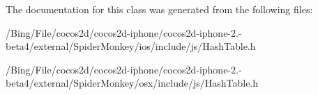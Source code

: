 The documentation for this class was generated from the following files\-:\begin{DoxyCompactItemize}
\item 
/\-Bing/\-File/cocos2d/cocos2d-\/iphone/cocos2d-\/iphone-\/2.-\/beta4/external/\-Spider\-Monkey/ios/include/js/Hash\-Table.\-h\item 
/\-Bing/\-File/cocos2d/cocos2d-\/iphone/cocos2d-\/iphone-\/2.-\/beta4/external/\-Spider\-Monkey/osx/include/js/Hash\-Table.\-h\end{DoxyCompactItemize}
